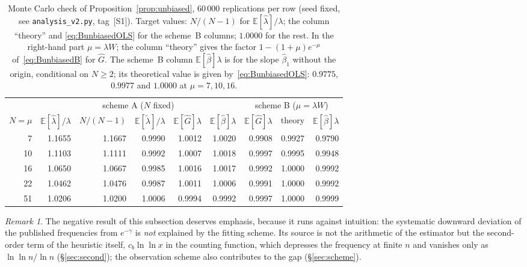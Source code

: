 \documentclass[11pt,a4paper]{article}
\theoremstyle{plain}
\theoremstyle{remark}
\newtheorem{remark}{Remark}
\newcommand{\emg}{e^{-\gamma}}
\begin{document}
\begin{table}[t]
\centering
\caption{Monte Carlo check of Proposition~\ref{prop:unbiased}, $60\,000$
replications per row (seed fixed, see \texttt{analysis\_v2.py}, tag~[S1]).
Target values: $N/(N-1)$ for $\mathbb E[\hat\lambda]/\lambda$; the column
``theory'' and \eqref{eq:BunbiasedOLS} for the scheme~B columns; $1.0000$ for
the rest. In the right-hand part $\mu=\lambda W$; the column ``theory'' gives the factor
$1-(1+\mu)e^{-\mu}$ of~\eqref{eq:BunbiasedB} for $\hat G$. The scheme~B column
$\mathbb E[\hat\beta]\lambda$ is for the slope $\hat\beta_1$ without the origin,
conditional on $N\ge2$; its theoretical value is given
by~\eqref{eq:BunbiasedOLS}: $0.9775$, $0.9977$ and $1.0000$ at $\mu=7,10,16$.}
\label{tab:mc}
\small
\begin{tabular}{rrrrrr@{\qquad}rrr}
\toprule
& \multicolumn{5}{c}{scheme A ($N$ fixed)} & \multicolumn{3}{c}{scheme B ($\mu=\lambda W$)}\\
\cmidrule(r){2-6}\cmidrule(l){7-9}
$N=\mu$ & $\mathbb E[\hat\lambda]/\lambda$ & $N/(N-1)$
& $\mathbb E[\tilde\lambda]/\lambda$ & $\mathbb E[\hat G]\lambda$
& $\mathbb E[\hat\beta]\lambda$
& $\mathbb E[\hat G]\lambda$ & theory & $\mathbb E[\hat\beta]\lambda$\\
\midrule
7 & 1.1655 & 1.1667 & 0.9990 & 1.0012 & 1.0020 & 0.9908 & 0.9927 & 0.9790\\
10 & 1.1103 & 1.1111 & 0.9992 & 1.0007 & 1.0018 & 0.9997 & 0.9995 & 0.9948\\
16 & 1.0650 & 1.0667 & 0.9985 & 1.0016 & 1.0017 & 0.9992 & 1.0000 & 0.9992\\
22 & 1.0462 & 1.0476 & 0.9987 & 1.0011 & 1.0006 & 0.9991 & 1.0000 & 0.9992\\
51 & 1.0206 & 1.0200 & 1.0006 & 0.9994 & 0.9992 & 0.9997 & 1.0000 & 0.9999\\
\bottomrule
\end{tabular}
\end{table}

\begin{remark}
The negative result of this subsection deserves emphasis, because it runs
against intuition: the systematic downward deviation of the published
frequencies from $\emg$ is \emph{not} explained by the fitting scheme. Its
source is not the arithmetic of the estimator but the second-order term of the
heuristic itself, $c_b\ln\ln x$ in the counting function, which depresses the
frequency at finite $n$ and vanishes only as $\ln\ln n/\ln n$
(\S\ref{sec:second}); the
observation scheme also contributes to the gap (\S\ref{sec:scheme}).
\end{remark}
\end{document}
